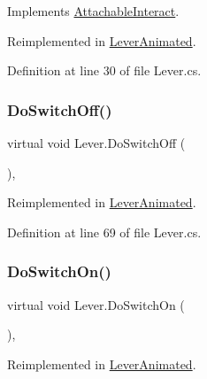 Implements \mbox{\hyperlink{class_attachable_interact_a9b07a54f1dbb96777c4bd287dfe438e3}{Attachable\+Interact}}.



Reimplemented in \mbox{\hyperlink{class_lever_animated_a63d3742fe2e3b7597c7eecbc57ae7a0e}{Lever\+Animated}}.



Definition at line 30 of file Lever.\+cs.

\mbox{\label{class_lever_af15223c9c4a5fd08045bd4a7aca73351}} 
\subsubsection{\texorpdfstring{Do\+Switch\+Off()}{DoSwitchOff()}}
{\footnotesize\ttfamily virtual void Lever.\+Do\+Switch\+Off (\begin{DoxyParamCaption}{ }\end{DoxyParamCaption})\hspace{0.3cm}{\ttfamily [protected]}, {\ttfamily [virtual]}}



Reimplemented in \mbox{\hyperlink{class_lever_animated_a2b56274f9c38469d1bb76321b87dc397}{Lever\+Animated}}.



Definition at line 69 of file Lever.\+cs.

\mbox{\label{class_lever_a9941602be9b41c21f29d18050941aa68}} 
\subsubsection{\texorpdfstring{Do\+Switch\+On()}{DoSwitchOn()}}
{\footnotesize\ttfamily virtual void Lever.\+Do\+Switch\+On (\begin{DoxyParamCaption}{ }\end{DoxyParamCaption})\hspace{0.3cm}{\ttfamily [protected]}, {\ttfamily [virtual]}}



Reimplemented in \mbox{\hyperlink{class_lever_animated_a2b655bf2b974e395ab4ffb343056c63d}{Lever\+Animated}}.




